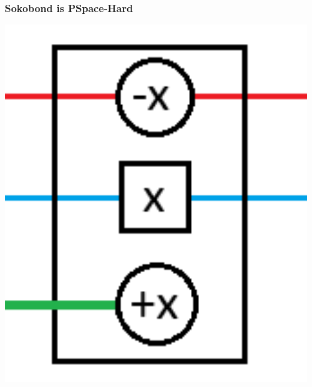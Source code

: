 \documentclass{beamer}
\begin{document}
\begin{frame}
  \frametitle{Sokobond is PSpace-Hard}
  \begin{minipage}[t]{0.49\textwidth}
    \includegraphics[width=1\textwidth]{res/doors/DoorOpenOptional.png}
  \end{minipage}
  \begin{minipage}[t]{0.49\textwidth}

\end{minipage}
\end{frame}
\end{document}
